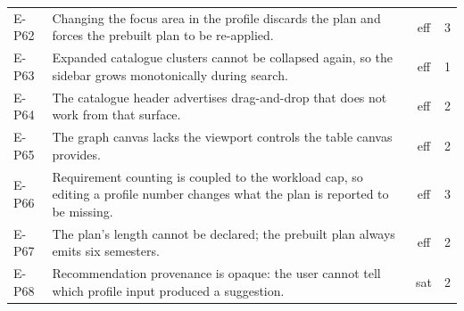 \begin{longtable}{p{1.6cm}p{9.6cm}cc}
    E-P62 & Changing the focus area in the profile discards the plan and forces the prebuilt plan to be re-applied. & eff & 3 \\
    E-P63 & Expanded catalogue clusters cannot be collapsed again, so the sidebar grows monotonically during search. & eff & 1 \\
    E-P64 & The catalogue header advertises drag-and-drop that does not work from that surface. & eff & 2 \\
    E-P65 & The graph canvas lacks the viewport controls the table canvas provides. & eff & 2 \\
    E-P66 & Requirement counting is coupled to the workload cap, so editing a profile number changes what the plan is reported to be missing. & eff & 3 \\
    E-P67 & The plan's length cannot be declared; the prebuilt plan always emits six semesters. & eff & 2 \\
    E-P68 & Recommendation provenance is opaque: the user cannot tell which profile input produced a suggestion. & sat & 2 \\
\end{longtable}
\normalsize

